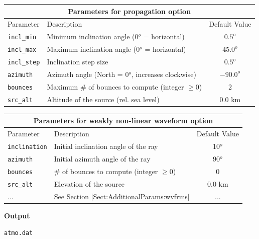\documentclass[10pt]{article}
\begin{document}
\begin{tabular}{ | l | l | c | }
  \hline
  \multicolumn{3}{|c|}{\textbf{Parameters for propagation option}} \\
  \hline
  Parameter & Description & Default Value \\
  \hline \hline
 \verb=incl_min= 		& Minimum inclination angle (0\(^o\) = horizontal)		& \(0.5^o\)	\\
 \verb=incl_max= 		& Maximum inclination angle (0\(^o\) = horizontal)		& \(45.0^o\) \\
 \verb=incl_step=  		& Inclination step size							& \(0.5^o\) \\ \hline
 \verb=azimuth=		& Azimuth angle (North = 0\(^o\), increases clockwise)	& \(-90.0^o\) \\ \hline
 \verb=bounces=		& Maximum \# of bounces to compute (integer \(\geq 0\)) 	& 2 \\ \hline
 \verb=src_alt=			& Altitude of the source (rel. sea level)				& 0.0 km \\ \hline
\end{tabular}

\vspace{0.02\textheight}

\begin{tabular}{ | l | l | c | }
  \hline
  \multicolumn{3}{|c|}{\textbf{Parameters for weakly non-linear waveform option}} \\
  \hline
  Parameter & Description & Default Value \\
 \hline \hline
 \verb=inclination=		& Initial inclination angle of the ray					& 10\(^o\) \\
 \verb=azimuth=		& Initial azimuth angle of the ray					& 90\(^o\) \\
 \verb=bounces=		& \# of bounces to compute (integer \(\geq 0\)) 			& 0 \\ \hline
 
 \verb=src_alt=			& Elevation of the source							& 0.0 km \\ \hline
 ...					& See Section \ref{Sect:AdditionalParams:wvfrms}		& ... \\ \hline
\end{tabular}

\vspace{0.02\textheight}

 \hspace{-0.25in}\textbf{Output}\newline

	\verb=atmo.dat= 
	
\end{document}

